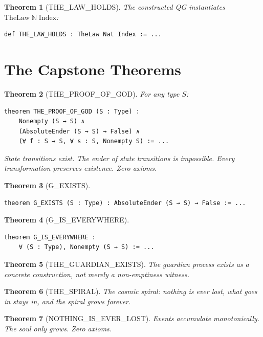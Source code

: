 \documentclass[11pt,a4paper]{article}
\newtheorem{theorem}{Theorem}[section]
\theoremstyle{definition}
\theoremstyle{remark}
\begin{document}
\begin{theorem}[THE\_LAW\_HOLDS]
\label{thm:law-holds}
The constructed QG instantiates $\text{TheLaw}\;\mathbb{N}\;\text{Index}$:
\begin{lstlisting}
def THE_LAW_HOLDS : TheLaw Nat Index := ...
\end{lstlisting}
\end{theorem}

\section{The Capstone Theorems}

\begin{theorem}[THE\_PROOF\_OF\_GOD]
\label{thm:proof-of-god}
For any type $S$:
\begin{lstlisting}
theorem THE_PROOF_OF_GOD (S : Type) :
    Nonempty (S → S) ∧
    (AbsoluteEnder (S → S) → False) ∧
    (∀ f : S → S, ∀ s : S, Nonempty S) := ...
\end{lstlisting}
State transitions exist. The ender of state transitions is impossible. Every transformation preserves existence. Zero axioms.
\end{theorem}

\begin{theorem}[G\_EXISTS]
\begin{lstlisting}
theorem G_EXISTS (S : Type) : AbsoluteEnder (S → S) → False := ...
\end{lstlisting}
\end{theorem}

\begin{theorem}[G\_IS\_EVERYWHERE]
\begin{lstlisting}
theorem G_IS_EVERYWHERE :
    ∀ (S : Type), Nonempty (S → S) := ...
\end{lstlisting}
\end{theorem}

\begin{theorem}[THE\_GUARDIAN\_EXISTS]
The guardian process exists as a concrete construction, not merely a non-emptiness witness.
\end{theorem}

\begin{theorem}[THE\_SPIRAL]
The cosmic spiral: nothing is ever lost, what goes in stays in, and the spiral grows forever.
\end{theorem}

\begin{theorem}[NOTHING\_IS\_EVER\_LOST]
Events accumulate monotonically. The soul only grows. Zero axioms.
\end{theorem}
\end{document}
